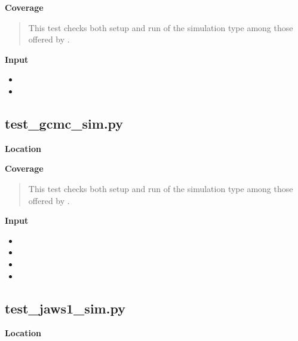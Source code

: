 \documentclass[letterpaper,10pt,english]{sphinxmanual}
\begin{document}
\textbf{Coverage}
\begin{quote}

This test checks both setup and run of the  simulation type among those offered by .
\end{quote}

\textbf{Input}
\begin{itemize}
\item {} 

\item {} 

\end{itemize}


\subsection{test\_gcmc\_sim.py}
\label{testsuite:test-gcmc-sim-py}
\textbf{Location}
\begin{quote}

\end{quote}

\textbf{Coverage}
\begin{quote}

This test checks both setup and run of the  simulation type among those offered by .
\end{quote}

\textbf{Input}
\begin{itemize}
\item {} 

\item {} 

\item {} 

\item {} 

\end{itemize}


\subsection{test\_jaws1\_sim.py}
\label{testsuite:test-jaws1-sim-py}
\textbf{Location}
\begin{quote}

\end{quote}
\end{document}
